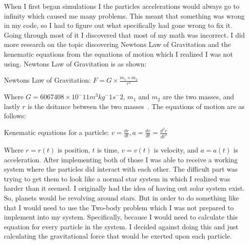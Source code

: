 \documentclass{egpubl}
\begin{document}
    When I first began simulations I the particles accelerations would always go to infinity which caused me many problems. This meant that something was wrong in my code, so I had to figure out what specifically had gone wrong to fix it. Going through most of it I discovered that most of my math was incorrect. I did more research on the topic discovering Newtons Law of Gravitation and the kenematic equations from the equations of motion which I realized I was not using. Newtons Law of Gravitation is as shown:

Newtons Law of Gravitation: $F = G\times \frac{m_1 \times m_2 }{r^2}$

Where $G = 6067408 \times 10^-11 m^3 kg^-1 s^-2$, $m_1$ and $m_2$ are the two masses, and lastly $r$ is the dsitance between the two masses~\cite{sasaki2018particle}. The equations of motion are as follows:

Kenematic equations for a particle: $v = \frac{dr}{dt}, a = \frac{dv}{dt} = \frac{d^2r}{dt^2}$

Where $r = r(t)$ is position, $t$ is time, $v = v(t)$ is velocity, and $a = a(t)$ is acceleration. After implementing both of those I was able to receive a working system where the particles did interact with each other. The difficult part was trying to get them to look like a normal star system in which I realized was harder than it seemed. I originally had the idea of having out solar system exist. So, planets would be revolving around stars. But in order to do something like that I would need to use the Two-body problem which I was not prepared to implement into my system. Specifically, because I would need to calculate this equation for every particle in the system. I decided against doing this and just calculating the gravitational force that would be exerted upon each particle.
\end{document}
